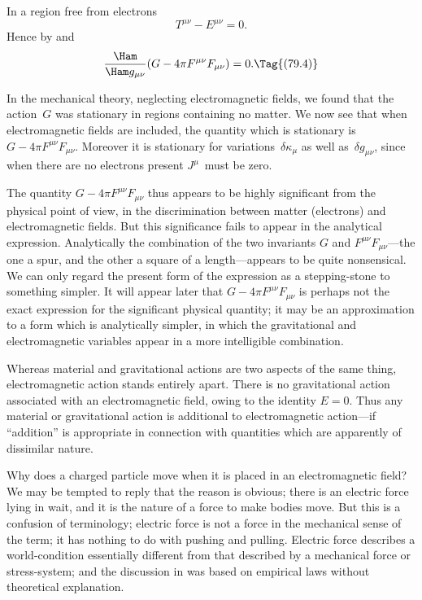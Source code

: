 \documentclass[12pt]{book}
\begin{document}
In a region free from electrons
\[
T^{\mu\nu} - E^{\mu\nu} = 0.
\]
Hence by  and~
\[
\frac{\Ham}{\Ham g_{\mu\nu}} (G - 4\pi F^{\mu\nu} F_{\mu\nu}) = 0.
\Tag{(79.4)}
\]

In the mechanical theory, neglecting electromagnetic fields, we found that
the action~$G$ was stationary in regions containing no matter. We now see
that when electromagnetic fields are included, the quantity which is stationary
is $G - 4\pi F^{\mu\nu} F_{\mu\nu}$. Moreover it is stationary for variations~$\delta\kappa_{\mu}$ as well as~$\delta g_{\mu\nu}$,
since when there are no electrons present $J^{\mu}$~must be zero.

The quantity $G - 4\pi F^{\mu\nu} F_{\mu\nu}$ thus appears to be highly significant from the
physical point of view, in the discrimination between matter (electrons) and
electromagnetic fields. But this significance fails to appear in the analytical
expression. Analytically the combination of the two invariants $G$ and $F^{\mu\nu} F_{\mu\nu}$---the
one a spur, and the other a square of a length---appears to be quite
nonsensical. We can only regard the present form of the expression as a
stepping-stone to something simpler. It will appear later that $G - 4\pi F^{\mu\nu} F_{\mu\nu}$
is perhaps not the exact expression for the significant physical quantity; it
may be an approximation to a form which is analytically simpler, in which
the gravitational and electromagnetic variables appear in a more intelligible
combination.

Whereas material and gravitational actions are two aspects of the same
thing, electromagnetic action stands entirely apart. There is no gravitational
action associated with an electromagnetic field, owing to the identity $E = 0$.
Thus any material or gravitational action is additional to electromagnetic
action---if ``addition'' is appropriate in connection with quantities which are
apparently of dissimilar nature.

%
%

Why does a charged particle move when it is placed in an electromagnetic
field? We may be tempted to reply that the reason is obvious; there is an
electric force lying in wait, and it is the nature of a force to make bodies
move. But this is a confusion of terminology; electric force is not a force in
the mechanical sense of the term; it has nothing to do with pushing and
pulling. Electric force describes a world-condition essentially different from
that described by a mechanical force or stress-system; and the discussion in
 was based on empirical laws without theoretical explanation.
\end{document}
